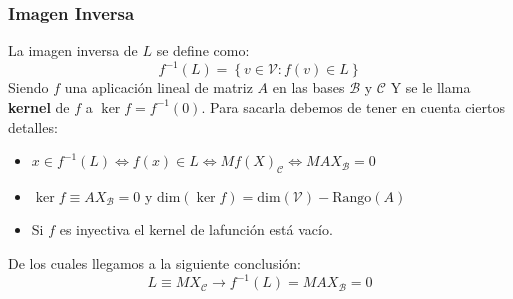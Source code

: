 \subsubsection{Imagen Inversa}
La imagen inversa de \(L\) se define como:
\[
        f^{-1}(L)= \left\{v \in \mathcal{V} : f(v) \in L\right\}
\]
Siendo \(f\) una aplicación lineal de matriz \(A\) en las bases \(\mathcal{B}\) y \(\mathcal{C}\)
Y se le llama \textbf{kernel} de \(f\) a \(\ker f = f^{-1}({0})\). Para sacarla debemos de tener en cuenta ciertos detalles:
\begin{itemize}
        \item \(x \in f^{-1}(L) \Leftrightarrow f(x) \in L \Leftrightarrow Mf(X)_\mathcal{C}\Leftrightarrow MAX_\mathcal{B} = 0\)
        \item \(\ker f \equiv A X_\mathcal{B} = 0\) y \(\text{dim}\left(\ker f\right) = \text{dim}\left(\mathcal{V}\right) - \text{Rango}\left(A\right)   \)
        \item Si \(f\) es inyectiva el kernel de lafunción está vacío.
\end{itemize}
De los cuales llegamos a la siguiente conclusión:
\[
        L \equiv M X_\mathcal{C} \rightarrow f^{-1}(L) = MAX_\mathcal{B} = 0
\]